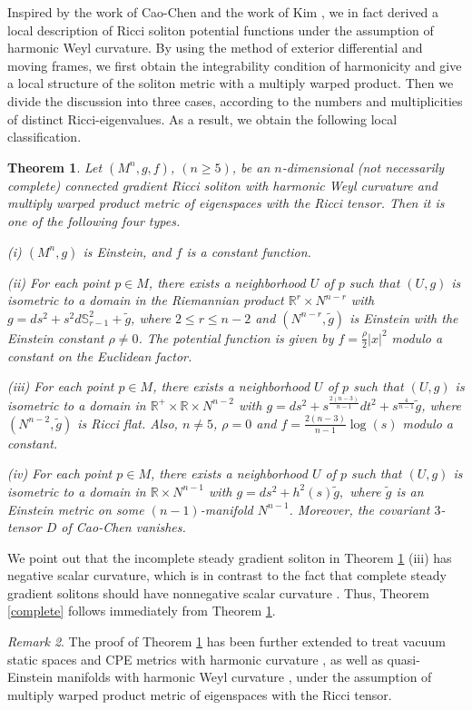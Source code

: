\documentclass{amsart}
\newtheorem{theorem}{Theorem}[section]
\theoremstyle{definition}
\theoremstyle{remark}
\newtheorem{remark}[theorem]{Remark}
\numberwithin{equation}{section}
\begin{document}
Inspired by the work of Cao-Chen \cite{CC1, CC2} and the work of Kim \cite{Kim}, we in fact derived a local description of Ricci soliton potential functions under the assumption of harmonic Weyl curvature. By using the method of exterior differential and moving frames, we first obtain the integrability condition of harmonicity and give a local structure of the soliton metric with a multiply warped product. Then we divide the discussion into three cases, according to the numbers and multiplicities of distinct Ricci-eigenvalues. As a result, we obtain the following local classification. 

\begin{theorem} \label{local}
	Let $(M^n, g, f)$, $(n\geq 5)$, be an $n$-dimensional (not necessarily complete) connected gradient Ricci soliton with harmonic Weyl curvature and multiply warped product metric of eigenspaces with the Ricci tensor. Then it is one of the following four types.
	
	\smallskip
	{\rm (i)} $(M^n, g)$ is Einstein, and $f$ is a constant function.
	
	\smallskip
	{\rm (ii)} For each point $p \in M$, there exists a neighborhood $U$ of $p$ such that $(U, g)$ is isometric to a domain in the Riemannian product $\mathbb{R}^{r}\times N^{n-r}$ with $g= ds^2 + s^2d\mathbb{S}^2_{r-1}+\tilde{g} $,
	where $2 \leq r\leq n-2$ and $\left(N^{n-r}, \tilde{g}\right)$ is Einstein with the Einstein constant $\rho\neq 0$.
	The potential function is given by $f = \frac{\rho}{2} |x|^2$ modulo a constant on the Euclidean factor.
	
	\smallskip
	{\rm (iii)} For each point $p \in M$, there exists a neighborhood $U$ of $p$ 
	such that $(U,g)$ is isometric to a domain in 
	$\mathbb{R^+}\times\mathbb{R} \times N^{n-2}$ 
	with 
	$g=ds^2 + s^{\frac{2(n-3)}{n-1}} dt^2+ s^{\frac{4}{n-1}} \tilde{g}$,  
	where $\left( N^{n-2}, \tilde{g}\right) $ is Ricci flat. 
	Also, $n\neq5$, $\rho=0$ and $f=\frac{2(n-3)}{n-1} \log (s)$ modulo a constant.
	
	\smallskip
	{\rm (iv)} For each point $p \in M$, 
	there exists a neighborhood $U$ of $p$ 
	such that $(U,g)$ is isometric to a domain in $\mathbb{R} \times N^{n-1}$ 
	with $g= ds^2 + h^2(s) \tilde{g},$
	where $\tilde{g}$ is an Einstein metric  
	on some $(n-1)$-manifold $N^{n-1}$.
	Moreover, the covariant $3$-tensor $D$ of Cao-Chen \cite{CC1, CC2} vanishes.
\end{theorem}

We point out that the incomplete steady gradient soliton in Theorem \ref{local} {\rm (iii)} has negative scalar curvature, which is in contrast to the fact that complete steady gradient solitons should have nonnegative scalar curvature \cite{Ch}. Thus, Theorem \ref{complete} follows immediately from Theorem \ref{local}.
\begin{remark} 
	The proof of Theorem \ref{local} has been further extended to treat vacuum static spaces and CPE metrics with harmonic curvature \cite {F-M-1, CL}, as well as quasi-Einstein manifolds with harmonic Weyl curvature \cite{CLS},  under the assumption of multiply warped product metric of eigenspaces  with the Ricci tensor.
\end{remark} 
\end{document}
